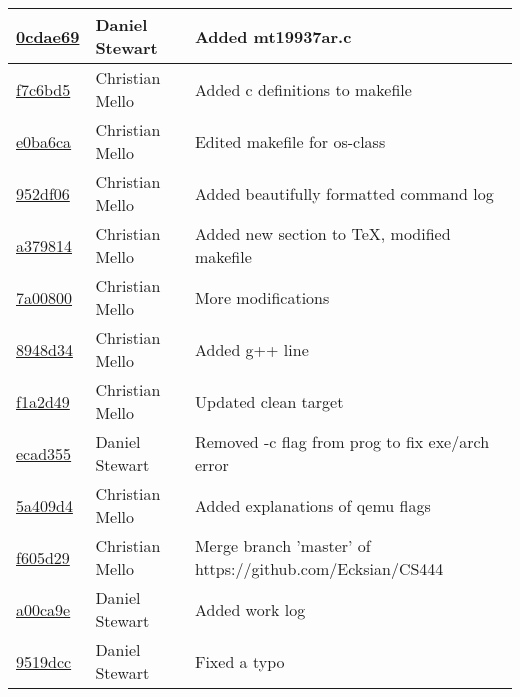 \begin{tabular}{l l l}
\href{https://github.com/Ecksian/CS444/commit/0cdae69bb8981673d0abbb2a86ce49afa9e48b42}{0cdae69} & Daniel Stewart & Added mt19937ar.c\\\hline
\href{https://github.com/Ecksian/CS444/commit/f7c6bd5e5c8dc245acc6faef0d0603062d369683}{f7c6bd5} & Christian Mello & Added c definitions to makefile\\\hline
\href{https://github.com/Ecksian/CS444/commit/e0ba6cace150ce7da59f4e0a91f16602927514e4}{e0ba6ca} & Christian Mello & Edited makefile for os-class\\\hline
\href{https://github.com/Ecksian/CS444/commit/952df068c60f4daef493814504b13faec4c2dd99}{952df06} & Christian Mello & Added beautifully formatted command log\\\hline
\href{https://github.com/Ecksian/CS444/commit/a37981480dd7960fd0abda47cec51f7ef5df35e2}{a379814} & Christian Mello & Added new section to TeX, modified makefile\\\hline
\href{https://github.com/Ecksian/CS444/commit/7a00800c9d45fb927e76bffb3696d20f8a2eb8ed}{7a00800} & Christian Mello & More modifications\\\hline
\href{https://github.com/Ecksian/CS444/commit/8948d34269b5d9fee8fb29953e0d6d5ddd9b2a4e}{8948d34} & Christian Mello & Added g++ line\\\hline
\href{https://github.com/Ecksian/CS444/commit/f1a2d49bfe6c28ffb585be6dd801c3435169cb20}{f1a2d49} & Christian Mello & Updated clean target\\\hline
\href{https://github.com/Ecksian/CS444/commit/ecad355e2c1a77156d7c612165add0e092374106}{ecad355} & Daniel Stewart & Removed -c flag from prog to fix exe/arch error\\\hline
\href{https://github.com/Ecksian/CS444/commit/5a409d4e4c552d36cc247e07a43036b8bd9bd24b}{5a409d4} & Christian Mello & Added explanations of qemu flags\\\hline
\href{https://github.com/Ecksian/CS444/commit/f605d29bc97a511b7686ea05cc93f3c54b71c5d8}{f605d29} & Christian Mello & Merge branch 'master' of https://github.com/Ecksian/CS444\\\hline
\href{https://github.com/Ecksian/CS444/commit/a00ca9e4172e2e9fca190100cda551e83eff0d76}{a00ca9e} & Daniel Stewart & Added work log\\\hline
\href{https://github.com/Ecksian/CS444/commit/9519dcc11becd4589054280026c7b57e1441a312}{9519dcc} & Daniel Stewart & Fixed a typo\\\hline\end{tabular}
